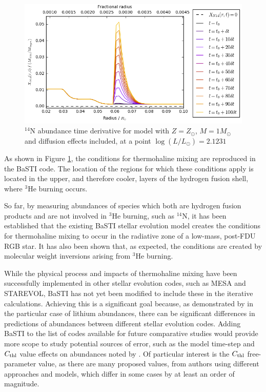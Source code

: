 \documentclass[12pt, a4paper]{report}
\begin{document}
\begin{figure}
\begin{center}
\includegraphics[scale=0.7]{../mu_test_data/mu_test_graphs/eq_logL=2p1231_time_diff_eq_Dvar_10dt_dmu_k_lim_crop.png}
\caption{$^{14}$N abundance time derivative for model with $Z = Z_{\odot}$, $M = 1M_{\odot}$ and diffusion effects included, at a point $\log(L/L_{\odot}) = 2.1231$}
\label{dXN14/dt_colour}
\end{center}
\end{figure}

As shown in Figure \ref{dXN14/dt_colour}, the conditions for thermohaline mixing are reproduced in the BaSTI code. The location of the regions for which these conditions apply is located in the upper, and therefore cooler, layers of the hydrogen fusion shell, where $^{3}$He burning occurs.

So far, by measuring abundances of species which both are hydrogen fusion products and are not involved in $^{3}$He burning, such as $^{14}$N, it has been established that the existing BaSTI stellar evolution model creates the conditions for thermohaline mixing to occur in the radiative zone of a low-mass, post-FDU RGB star. It has also been shown that, as expected, the conditions are created by molecular weight inversions arising from $^{3}$He burning.

While the physical process and impacts of thermohaline mixing have been successfully implemented in other stellar evolution codes, such as MESA and STAREVOL, BaSTI has not yet been modified to include these in the iterative calculations. Achieving this is a significant goal because, as demonstrated by \cite{2015MNRAS.446.2673L} in the particular case of lithium abundances, there can be significant differences in predictions of abundances between different stellar evolution codes. Adding BaSTI to the list of codes available for future comparative studies would provide more scope to study potential sources of error, such as the model time-step and $C_{\textnormal{thl}}$ value effects on abundances noted by \cite{2015MNRAS.446.2673L}. Of particular interest is the $C_{\textnormal{thl}}$ free-parameter value, as there are many proposed values, from authors using different approaches and models, which differ in some cases by at least an order of magnitude.
\end{document}
